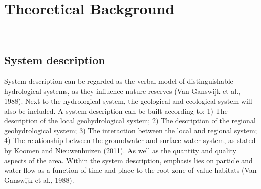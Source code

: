 \chapter{Theoretical Background}
\\



\section{System description}
System description can be regarded as the verbal model of distinguishable hydrological systems, as they influence nature reserves (Van Ganswijk et al., 1988). Next to the hydrological system, the geological and ecological system will also be included. A system description can be built according to: 1) The description of the local geohydrological system; 2) The description of the regional geohydrological system; 3) The interaction between the local and regional system; 4) The relationship between the groundwater and surface water system, as stated by Koomen and Nieuwenhuizen (2011). As well as the quantity and quality aspects of the area. Within the system description, emphasis lies on particle and water flow as a function of time and place to the root zone of value habitats (Van Ganswijk et al., 1988). 

